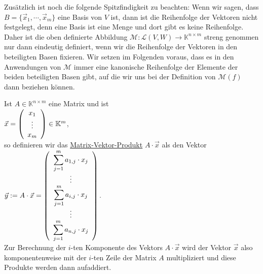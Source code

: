 Zus\"{a}tzlich ist noch die folgende Spitzfindigkeit zu beachten:  Wenn wir sagen, dass 
$B = \{\vec{x}_1, \cdots, \vec{x}_m \}$ eine Basis von $V$ ist, dann ist die Reihenfolge der
Vektoren nicht festgelegt, denn eine Basis ist eine Menge und dort gibt es keine
Reihenfolge.  Daher ist die oben definierte Abbildung $\mathcal{M}: \mathcal{L}(V,W) \rightarrow\mathbb{K}^{n \times m}$ 
streng genommen nur dann eindeutig definiert, wenn wir die Reihenfolge der Vektoren in den
beteiligten Basen fixieren. 
Wir setzen im Folgenden voraus, dass es in den Anwendungen von $\mathcal{M}$ immer eine kanonische
Reihenfolge der Elemente der beiden beteiligten Basen gibt, auf die wir uns bei der Definition von
$\mathcal{M}(f)$ dann beziehen k\"{o}nnen.
\eox


 Ist $A \in \mathbb{K}^{n \times m}$ eine Matrix und ist 
\\[0.5cm]
\hspace*{1.3cm}
$\vec{x} = \left(
      \begin{array}[c]{c}
      x_{1}  \\
      \vdots \\
      x_{m}  \\
      \end{array}
    \right) \in \mathbb{K}^m
$,
\\[0.5cm]
so definieren wir das \href{https://de.wikipedia.org/wiki/Matrix-Vektor-Produkt}{Matrix-Vektor-Produkt} $A \cdot \vec{x}$ als den Vektor
\\[0.5cm]
\hspace*{1.3cm}
$\vec{y} := A \cdot \vec{x} = \left(
      \begin{array}[c]{c}
      \displaystyle \sum\limits_{j=1}^m a_{1,j} \cdot x_{j}  \\
      \vdots \\
      \displaystyle \sum\limits_{j=1}^m a_{i,j} \cdot x_{j}  \\
      \vdots \\
      \displaystyle \sum\limits_{j=1}^m a_{n,j} \cdot x_{j}  \\
      \end{array}
      \right). 
$
\\[0.5cm]
Zur Berechnung der $i$-ten Komponente des Vektors $A \cdot \vec{x}$ wird der Vektor $\vec{x}$
also komponentenweise mit der $i$-ten Zeile der Matrix $A$ multipliziert und diese Produkte werden
dann aufaddiert.

